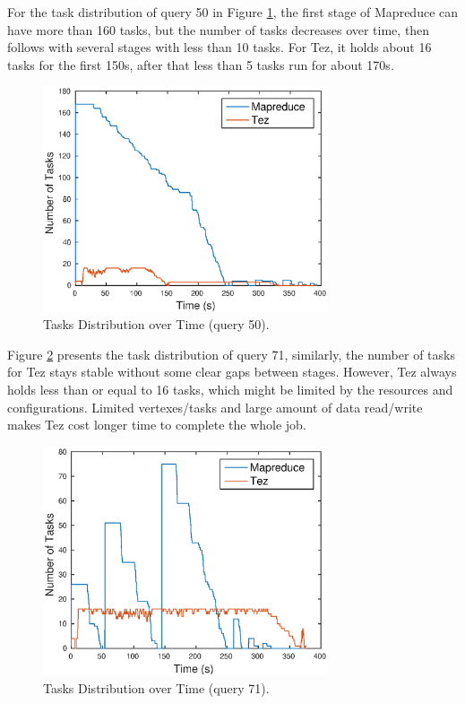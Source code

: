 \documentclass[10pt]{article}
\begin{document}
For the task distribution of query 50 in Figure \ref{fig:q1c_tasks_50}, the first stage of Mapreduce can have more than 160 tasks, but the number of tasks decreases over time, then follows with several stages with less than 10 tasks. For Tez, it holds about 16 tasks for the first 150s, after that less than 5 tasks run for about 170s. 

\begin{figure}
\begin{center}
\includegraphics[width=0.75\textwidth]{pic/q1c_task_distribution_50}
\caption{Tasks Distribution over Time (query 50).}
\label{fig:q1c_tasks_50}
\end{center}
\end{figure}

Figure \ref{fig:q1c_tasks_71} presents the task distribution of query 71, similarly, the number of tasks for Tez stays stable without some clear gaps between stages. However, Tez always holds less than or equal to 16 tasks, which might be limited by the resources and configurations. Limited vertexes/tasks and large amount of data read/write makes Tez cost longer time to complete the whole job.

\begin{figure}
\begin{center}
\includegraphics[width=0.75\textwidth]{pic/q1c_task_distribution_71}
\caption{Tasks Distribution over Time (query 71).}
\label{fig:q1c_tasks_71}
\end{center}
\end{figure}
\end{document}
